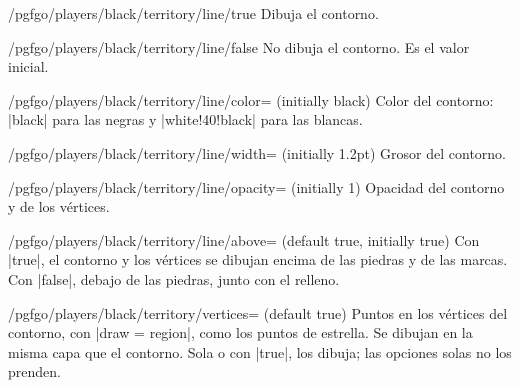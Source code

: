 	\begin{key}{/pgfgo/players/black/territory/line/true}
		Dibuja el contorno.
	\end{key}

	\begin{key}{/pgfgo/players/black/territory/line/false}
		No dibuja el contorno. Es el valor inicial.
	\end{key}

	\begin{key}{/pgfgo/players/black/territory/line/color= (initially black)}
		Color del contorno: |black| para las negras y |white!40!black| para las blancas.
	\end{key}

	\begin{key}{/pgfgo/players/black/territory/line/width= (initially 1.2pt)}
		Grosor del contorno.
	\end{key}

	\begin{key}{/pgfgo/players/black/territory/line/opacity= (initially 1)}
		Opacidad del contorno y de los vértices.
	\end{key}

	\begin{key}{/pgfgo/players/black/territory/line/above= (default true, initially true)}
		Con |true|, el contorno y los vértices se dibujan encima de las piedras y de las marcas. Con |false|, debajo de las piedras, junto con el relleno.

		\begin{codeexample}[]
			\begin{goban}[5]
			\end{goban}

			\begin{goban}[5]
			\end{goban}
		\end{codeexample}
	\end{key}

	\begin{key}{/pgfgo/players/black/territory/vertices= (default true)}
		Puntos en los vértices del contorno, con |draw = region|, como los puntos de estrella. Se dibujan en la misma capa que el contorno. Sola o con |true|, los dibuja; las opciones solas no los prenden.
	\end{key}

